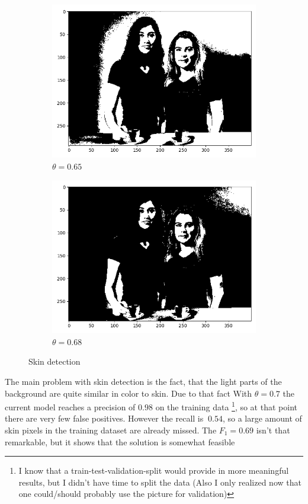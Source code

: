 \documentclass{scrartcl}
\begin{document}
\begin{figure}[h]
\begin{subfigure}[b]{0.45\textwidth}
		\centering
		\includegraphics[width=\textwidth]{images/skinTheta0.65}
		\caption{$\theta=0.65$}
	\end{subfigure}
\hfill
\begin{subfigure}[b]{0.45\textwidth}
	\centering
	\includegraphics[width=\textwidth]{images/skinTheta0.68}
	\caption{$\theta=0.68$}
\end{subfigure}
	\caption{Skin detection}
	\label{fig:skin}
\end{figure}
The main problem with skin detection is the fact, that the light parts of the background are quite similar in color to skin.
Due to that fact 
With $\theta=0.7$ the current model reaches a precision of $0.98$ on the training data \footnote{I know that a train-test-validation-split would provide in more meaningful results, but I didn't have time to split the data (Also I only realized now that one could/should probably use the picture for validation)}, so at that point there are very few false positives.
However the recall is $~0.54$, so a large amount of skin pixels in the training dataset are already missed. The $F_1=0.69$  isn't that remarkable, but it shows that the solution is somewhat feasible
\end{document}
